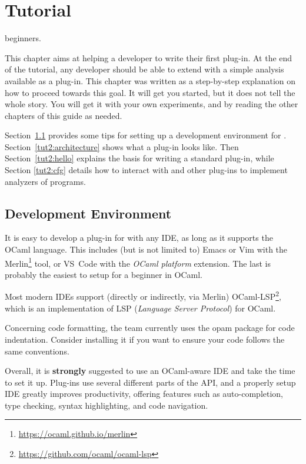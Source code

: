 
\chapter{Tutorial}\label{chap:tutorial}

\begin{target}beginners.\end{target}

This chapter aims at helping a developer to write their first \framac plug-in.
At the end of the tutorial, any developer should be able to extend \framac with
a simple analysis available as a \framac plug-in. This chapter was written as a
step-by-step explanation on how to proceed towards this goal. It will get you
started, but it does not tell the whole story. You will get it with your own
experiments, and by reading the other chapters of this guide as needed.

Section~\ref{tut2:environment} provides some tips for setting up a
development environment for \framac.
Section~\ref{tut2:architecture} shows what a plug-in looks like. Then
Section~\ref{tut2:hello} explains the basis for writing a standard \framac
plug-in, while Section \ref{tut2:cfg} details how to interact
with \framac and other plug-ins to implement analyzers of \C programs.

\section{Development Environment}\label{tut2:environment}

It is easy to develop a plug-in for \framac with any IDE, as long as it
supports the OCaml language. This includes (but is not limited to)
Emacs or Vim with the Merlin\footnote{\url{https://ocaml.github.io/merlin}}
tool, or VS~Code with the {\em OCaml platform} extension.
The last is probably the easiest to setup for a beginner in OCaml.

Most modern IDEs support (directly or indirectly, via Merlin)
OCaml-LSP\footnote{\url{https://github.com/ocaml/ocaml-lsp}},
which is an implementation of LSP ({\em Language Server Protocol}) for OCaml.

Concerning code formatting, the \framac team currently uses the \ocpindent opam
package for code indentation. Consider installing it if you want to ensure your
code follows the same conventions.

Overall, it is \textbf{strongly} suggested to use an OCaml-aware IDE and take
the time to set it up. Plug-ins use several different parts of the \framac API,
and a properly setup IDE greatly improves productivity, offering features such
as auto-completion, type checking, syntax highlighting, and code navigation.

